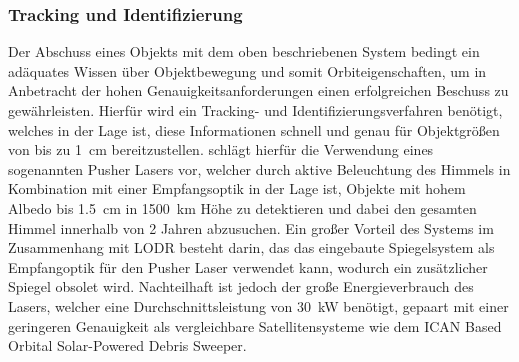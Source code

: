 \documentclass{article}
\begin{document}
\subsubsection{Tracking und Identifizierung}
Der Abschuss eines Objekts mit dem oben beschriebenen System bedingt ein adäquates Wissen über Objektbewegung und somit Orbiteigenschaften, um in Anbetracht der hohen Genauigkeitsanforderungen einen erfolgreichen Beschuss zu gewährleisten. Hierfür wird ein Tracking- und Identifizierungsverfahren benötigt, welches in der Lage ist, diese Informationen schnell und genau für Objektgrößen von bis zu \SI{1}{\centi\meter} bereitzustellen. \citet{phipps1996orion} schlägt hierfür die Verwendung eines sogenannten Pusher Lasers vor, welcher durch aktive Beleuchtung des Himmels in Kombination mit einer Empfangsoptik in der Lage ist, Objekte mit hohem Albedo bis \SI{1.5}{\centi\meter} in \SI{1500}{\kilo\meter} Höhe zu detektieren und dabei den gesamten Himmel innerhalb von 2 Jahren abzusuchen. Ein großer Vorteil des Systems im Zusammenhang mit LODR besteht darin, das das eingebaute Spiegelsystem als Empfangoptik für den Pusher Laser verwendet kann, wodurch ein zusätzlicher Spiegel obsolet wird. Nachteilhaft ist jedoch der große Energieverbrauch des Lasers, welcher eine Durchschnittsleistung von \SI{30}{\kilo\watt} benötigt, gepaart mit einer geringeren Genauigkeit als vergleichbare Satellitensysteme wie dem ICAN Based Orbital Solar-Powered Debris Sweeper.
\end{document}
